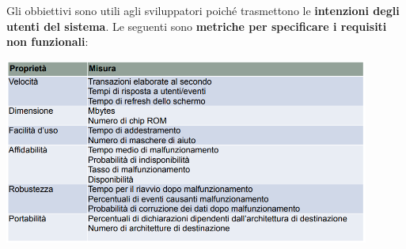 \documentclass[12pt]{article}
\begin{document}
Gli obbiettivi sono utili agli sviluppatori poiché trasmettono le \textbf{intenzioni degli utenti del sistema}.
Le seguenti sono \textbf{metriche per specificare i requisiti non funzionali}:
\begin{center}
    \includegraphics[width = 0.90\textwidth]{Images/29.png}
\end{center}
\end{document}
